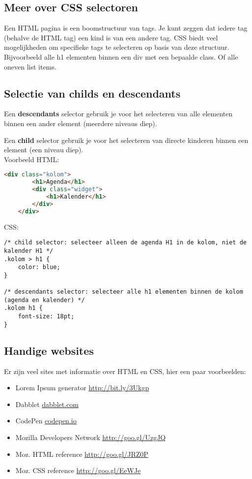 \documentclass[8pt,pagesize,footinclude=false,headinclude=false]{scrartcl}
\begin{document}
\begin{multicols*}{4}
\clearpage

\section*{Meer over CSS selectoren}
Een HTML pagina is een boomstructuur van tags. Je kunt zeggen dat iedere tag (behalve de HTML tag) een kind is van een andere tag. CSS biedt veel mogelijkheden om specifieke tags te selecteren op basis van deze structuur. Bijvoorbeeld alle h1 elementen binnen een div met een bepaalde class. Of alle oneven list items.

\subsection*{Selectie van childs en descendants}
Een \textbf{descendants} selector gebruik je voor het selecteren van alle elementen binnen een ander element (meerdere niveaus diep).

Een \textbf{child} selector gebruik je voor het selecteren van directe kinderen binnen een element (een niveau diep).\\
\noindent Voorbeeld HTML:
\begin{lstlisting}[language=HTML]
	<div class="kolom">
		<h1>Agenda</h1>
		<div class="widget">
			<h1>Kalender</h1>
		</div>
	</div>
\end{lstlisting}

\noindent CSS:
\begin{lstlisting}
/* child selector: selecteer alleen de agenda H1 in de kolom, niet de kalender H1 */
.kolom > h1 {
	color: blue;
}

/* descendants selector: selecteer alle h1 elementen binnen de kolom (agenda en kalender) */
.kolom h1 {
	font-size: 18pt;
}
\end{lstlisting}

\subsection*{Handige websites}
Er zijn veel sites met informatie over HTML en CSS, hier een paar voorbeelden:
\begin{itemize}
	\item Lorem Ipsum generator \url{http://bit.ly/3Ukgp}
	\item Dabblet \url{dabblet.com}
	\item CodePen \url{codepen.io}
	\item Mozilla Developers Network \url{http://goo.gl/UzgJQ}
	\item Moz. HTML reference \url{http://goo.gl/JRZ0P}
	\item Moz. CSS reference \url{http://goo.gl/EeWJe}
\end{itemize}

\end{multicols*}
\end{document}
